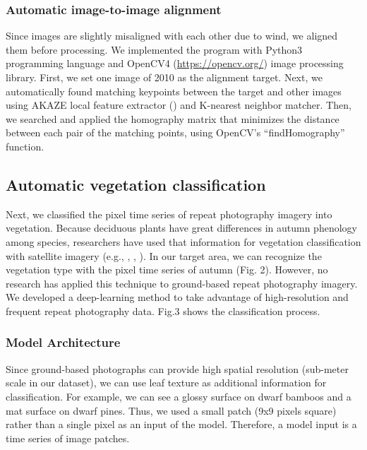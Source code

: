 \documentclass{article}
\begin{document}
\hypertarget{automatic-image-to-image-alignment}{%
\subsubsection{Automatic image-to-image alignment}\label{automatic-image-to-image-alignment}}

Since images are slightly misaligned with each other due to wind, we aligned them before processing. We implemented the program with Python3 programming language and OpenCV4 (\url{https://opencv.org/}) image processing library. First, we set one image of 2010 as the alignment target. Next, we automatically found matching keypoints between the target and other images using AKAZE local feature extractor (\cite{Alcantarilla2013AKAZE}) and K-nearest neighbor matcher. Then, we searched and applied the homography matrix that minimizes the distance between each pair of the matching points, using OpenCV's ``findHomography'' function.

\hypertarget{automatic-vegetation-classification}{%
\subsection{Automatic vegetation classification}\label{automatic-vegetation-classification}}

Next, we classified the pixel time series of repeat photography imagery into vegetation. Because deciduous plants have great differences in autumn phenology among species, researchers have used that information for vegetation classification with satellite imagery (e.g., \cite{Tigges2013RemSenEnv}, \cite{Son2013RemSen}, \cite{Heupel2018PFG}). In our target area, we can recognize the vegetation type with the pixel time series of autumn (Fig. 2). However, no research has applied this technique to ground-based repeat photography imagery. We developed a deep-learning method to take advantage of high-resolution and frequent repeat photography data. Fig.3 shows the classification process.

\hypertarget{model-architecture}{%
\subsubsection{Model Architecture}\label{model-architecture}}

Since ground-based photographs can provide high spatial resolution (sub-meter scale in our dataset), we can use leaf texture as additional information for classification. For example, we can see a glossy surface on dwarf bamboos and a mat surface on dwarf pines. Thus, we used a small patch (9x9 pixels square) rather than a single pixel as an input of the model. Therefore, a model input is a time series of image patches.
\end{document}
